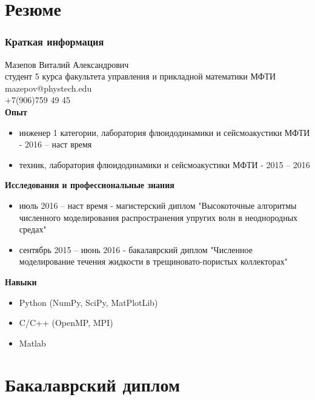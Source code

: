 \documentclass[unicode,aspectratio=43]{beamer}
\title[Schlumberger]{}
\author[Мазепов Виталий]{\textbf{Мазепов Виталий}}
\begin{document}
\begin{frame}[plain]

\tableofcontents
\end{frame}

\section{Резюме}

\begin{frame}\frametitle{Краткая информация}
	\scriptsize{
		Мазепов Виталий Александрович \\
		студент 5 курса факультета управления и прикладной математики МФТИ \\ 
		mazepov@phystech.edu \\
		+7(906)759 49 45 \\
		\small\textbf{Опыт} \\
		\scriptsize
		\begin{itemize}
			\item инженер 1 категории, лаборатория флюидодинамики и сейсмоакустики МФТИ - 2016 -- наст время
			\item техник, лаборатория флюидодинамики и сейсмоакустики МФТИ - 2015 -- 2016
		\end{itemize}
		\small\textbf{Исследования и профессиональные знания} \\
		\scriptsize
		\begin{itemize}
			\item июль 2016 -- наст время - магистерский диплом "Высокоточные алгоритмы численного моделирования распространения упругих волн в неоднородных средах"
			\item сентябрь 2015 -- июнь 2016 - бакалаврский диплом "Численное моделирование течения жидкости в трещиновато-пористых коллекторах"
		\end{itemize}
				\small\textbf{Навыки} \\
				\scriptsize
				\begin{itemize}
					\item Python (NumPy, SciPy, MatPlotLib)
					\item C/C++ (OpenMP, MPI)
					\item Matlab
				\end{itemize}
	}
\end{frame}

\section{Бакалаврский диплом}
\end{document}
